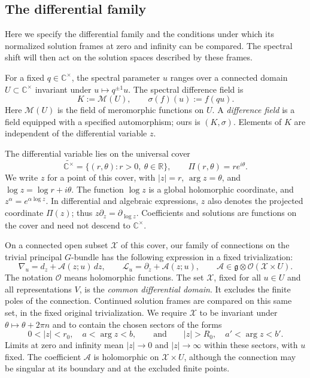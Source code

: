 \documentclass[11pt,leqno]{amsart}
\numberwithin{equation}{section}
\theoremstyle{plain}
\theoremstyle{definition}
\theoremstyle{plain}
\theoremstyle{definition}
\theoremstyle{remark}
\newcommand{\g}{\mathfrak g}
\begin{document}
\subsection{The differential family}\label{sec:general-hypotheses}\label{sec:general-analytic-setting}
Here we specify the differential family and the conditions under which its normalized solution frames at zero and infinity can be compared.  The spectral shift will then act on the solution spaces described by these frames.

For a fixed $q\in\mathbb C^\times$, the spectral parameter $u$ ranges over a connected domain $U\subset\mathbb C^\times$ invariant under $u\mapsto q^{\pm1}u$.  The spectral difference field is
\[
 K:=\mathcal M(U),\qquad \sigma(f)(u):=f(qu).
\]
Here $\mathcal M(U)$ is the field of meromorphic functions on $U$.  A \emph{difference field} is a field equipped with a specified automorphism; ours is $(K,\sigma)$.  Elements of $K$ are independent of the differential variable $z$.

The differential variable lies on the universal cover
\[
 \widetilde{\mathbb C^\times}
 =\{(r,\theta):r>0,\ \theta\in\mathbb R\},
 \qquad \Pi(r,\theta)=re^{i\theta}.
\]
We write $z$ for a point of this cover, with $|z|=r$, $\arg z=\theta$, and $\log z=\log r+i\theta$.  The function $\log z$ is a global holomorphic coordinate, and $z^\alpha=e^{\alpha\log z}$.  In differential and algebraic expressions, $z$ also denotes the projected coordinate $\Pi(z)$; thus $z\partial_z=\partial_{\log z}$.  Coefficients and solutions are functions on the cover and need not descend to $\mathbb C^\times$.

On a connected open subset $\mathscr X$ of this cover, our family of connections on the trivial principal $G$-bundle has the following expression in a fixed trivialization:
\begin{equation}\label{eq:general-connection}
 \nabla_u=d_z+\mathscr A(z;u)\,dz,\qquad
 \mathcal L_u=\partial_z+\mathscr A(z;u),\qquad
 \mathscr A\in\g\otimes\mathcal O(\mathscr X\times U).
\end{equation}
The notation $\mathcal O$ means holomorphic functions.  The set $\mathscr X$, fixed for all $u\in U$ and all representations $V$, is the \emph{common differential domain}.  It excludes the finite poles of the connection.  Continued solution frames are compared on this same set, in the fixed original trivialization.  We require $\mathscr X$ to be invariant under $\theta\mapsto\theta+2\pi n$ and to contain the chosen sectors of the forms
\[
 0<|z|<r_0,\quad a<\arg z<b,
 \qquad\text{and}\qquad
 |z|>R_0,\quad a'<\arg z<b'.
\]
Limits at zero and infinity mean $|z|\to0$ and $|z|\to\infty$ within these sectors, with $u$ fixed.  The coefficient $\mathscr A$ is holomorphic on $\mathscr X\times U$, although the connection may be singular at its boundary and at the excluded finite points.
\end{document}
